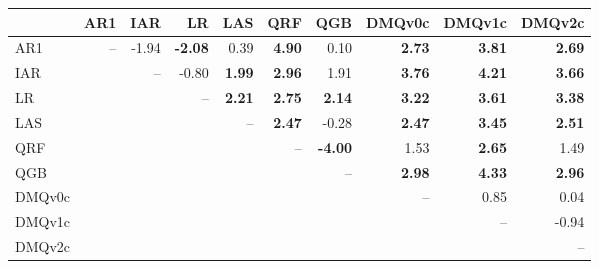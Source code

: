 \begin{tabular}{lrrrrrrrrr}
\toprule
 & AR1 & IAR & LR & LAS & QRF & QGB & DMQv0c & DMQv1c & DMQv2c \\
\midrule
AR1 & -- & -1.94 & \textbf{-2.08} & 0.39 & \textbf{4.90} & 0.10 & \textbf{2.73} & \textbf{3.81} & \textbf{2.69} \\
IAR &  & -- & -0.80 & \textbf{1.99} & \textbf{2.96} & 1.91 & \textbf{3.76} & \textbf{4.21} & \textbf{3.66} \\
LR &  &  & -- & \textbf{2.21} & \textbf{2.75} & \textbf{2.14} & \textbf{3.22} & \textbf{3.61} & \textbf{3.38} \\
LAS &  &  &  & -- & \textbf{2.47} & -0.28 & \textbf{2.47} & \textbf{3.45} & \textbf{2.51} \\
QRF &  &  &  &  & -- & \textbf{-4.00} & 1.53 & \textbf{2.65} & 1.49 \\
QGB &  &  &  &  &  & -- & \textbf{2.98} & \textbf{4.33} & \textbf{2.96} \\
DMQv0c &  &  &  &  &  &  & -- & 0.85 & 0.04 \\
DMQv1c &  &  &  &  &  &  &  & -- & -0.94 \\
DMQv2c &  &  &  &  &  &  &  &  & -- \\
\bottomrule
\end{tabular}
